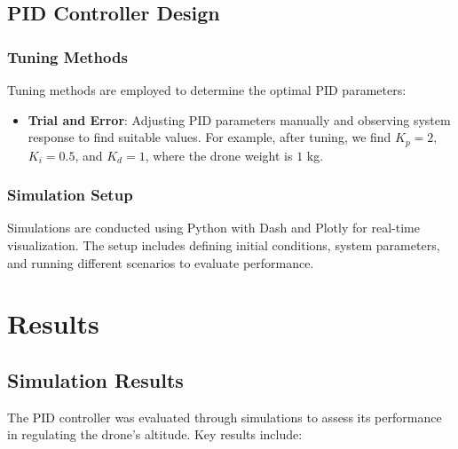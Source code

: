 \documentclass[a4paper,12pt]{article}
\begin{document}
\subsection{PID Controller Design}

\subsubsection{Tuning Methods}

 Tuning methods are employed to determine the optimal PID parameters:

\begin{itemize}
    \item \textbf{Trial and Error}: Adjusting PID parameters manually and observing system response to find suitable values. For example, after tuning, we find \( K_p = 2 \), \( K_i = 0.5 \), and \( K_d = 1 \), where the drone weight is \( 1 \) kg.
\end{itemize}

\subsubsection{Simulation Setup}

Simulations are conducted using Python with Dash and Plotly for real-time visualization. The setup includes defining initial conditions, system parameters, and running different scenarios to evaluate performance.

\section{Results}

\subsection{Simulation Results}

The PID controller was evaluated through simulations to assess its performance in regulating the drone's altitude. Key results include:
\end{document}
